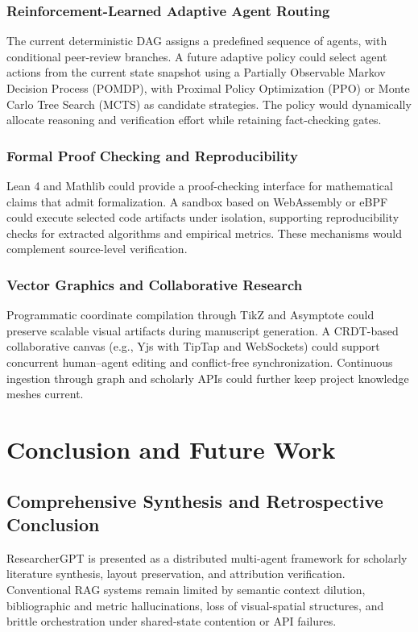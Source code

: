 \documentclass[conference]{IEEEtran}
\begin{document}
\subsubsection{Reinforcement-Learned Adaptive Agent Routing}
The current deterministic DAG assigns a predefined sequence of agents, with conditional peer-review branches. A future adaptive policy could select agent actions from the current state snapshot using a Partially Observable Markov Decision Process (POMDP), with Proximal Policy Optimization (PPO) or Monte Carlo Tree Search (MCTS) as candidate strategies. The policy would dynamically allocate reasoning and verification effort while retaining fact-checking gates.

\subsubsection{Formal Proof Checking and Reproducibility}
Lean 4 and Mathlib could provide a proof-checking interface for mathematical claims that admit formalization. A sandbox based on WebAssembly or eBPF could execute selected code artifacts under isolation, supporting reproducibility checks for extracted algorithms and empirical metrics. These mechanisms would complement source-level verification.

\subsubsection{Vector Graphics and Collaborative Research}
Programmatic coordinate compilation through TikZ and Asymptote could preserve scalable visual artifacts during manuscript generation. A CRDT-based collaborative canvas (e.g., Yjs with TipTap and WebSockets) could support concurrent human--agent editing and conflict-free synchronization. Continuous ingestion through graph and scholarly APIs could further keep project knowledge meshes current.

\section{Conclusion and Future Work}
\subsection{Comprehensive Synthesis and Retrospective Conclusion}
ResearcherGPT is presented as a distributed multi-agent framework for scholarly literature synthesis, layout preservation, and attribution verification. Conventional RAG systems remain limited by semantic context dilution, bibliographic and metric hallucinations, loss of visual-spatial structures, and brittle orchestration under shared-state contention or API failures.
\end{document}
